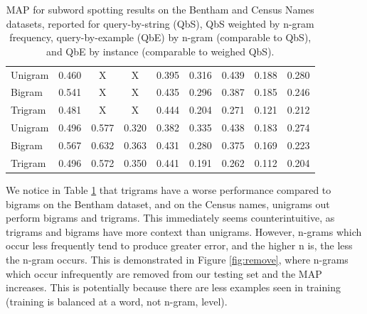 \documentclass[ms,electronic,twosidetoc,letterpaper,chaptercenter,parttop,lol,lof,lot]{byumsphd}
\begin{document}
\begin{table}
\begin{tabular}{| l | c c c c | c c c c |}
  \hline %
  Unigram & 0.460 & X & X & 0.395  & 0.316 & 0.439 & 0.188 & 0.280\\ %
  Bigram  & 0.541 & X & X & 0.435  & 0.296 & 0.387 & 0.185 & 0.246\\ 
  Trigram & 0.481 & X & X & 0.444  & 0.204 & 0.271 & 0.121 & 0.212\\ 
  \hline %
  Unigram & 0.496 & 0.577 & 0.320 & 0.382  & 0.335 & 0.438 & 0.183 & 0.274\\
  Bigram  & 0.567 & 0.632 & 0.363 & 0.431  & 0.280 & 0.375 & 0.169 & 0.223\\ 
  Trigram & 0.496 & 0.572 & 0.350 & 0.441  & 0.191 & 0.262 & 0.112 & 0.204\\ 
  \hline 
\end{tabular}
\caption{MAP for subword spotting results on the Bentham and Census Names datasets, reported for query-by-string (QbS), QbS weighted by n-gram frequency, query-by-example (QbE) by n-gram (comparable to QbS), and QbE by instance (comparable to weighed QbS).}
\label{tab:subwordspotting}
\end{table}

We notice in Table \ref{tab:subwordspotting} that trigrams have a worse performance compared to bigrams on the Bentham dataset, and on the Census names, unigrams out perform bigrams and trigrams. This immediately seems counterintuitive, as trigrams and bigrams have more context than unigrams. However, n-grams which occur less frequently tend to produce greater error, and the higher n is, the less the n-gram occurs. 
This is demonstrated in Figure \ref{fig:remove}, where n-grams which occur infrequently are removed from our testing set and the MAP increases. This is potentially because there are less examples seen in training (training is balanced at a word, not n-gram, level).
\end{document}
